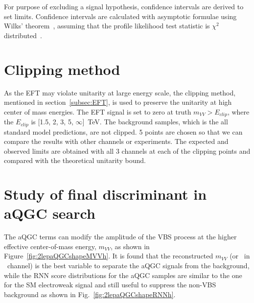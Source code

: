 For purpose of excluding a signal hypothesis, confidence intervals are derived to set limits. 
Confidence intervals are calculated with asymptotic formulae using Wilks' theorem~\cite{10.1214/aoms/1177732360}, assuming that the profile likelihood test statistic is $\chi^2$ distributed~\cite{Cowan:2010js}.

\section{Clipping method}
\label{subsec:clipping}
As the EFT may violate unitarity at large energy scale, the clipping method, mentioned in section~\ref{subsec:EFT}, is used to preserve the unitarity at high center of mass energies. 
The EFT signal is set to zero at truth $m_{VV} > E_{clip}$, where the $E_{clip}$ is [1.5, 2, 3, 5, $\infty$]~TeV. 
The background samples, which is the all standard model predictions, are not clipped.
5 points are chosen so that we can compare the results with other channels or experiments.
The expected and observed limits are obtained with all 3 channels at each of the clipping points and compared with the theoretical unitarity bound.

\section{Study of final discriminant in aQGC search}
\label{subsec:2binapproach}
The aQGC terms can modify the amplitude of the VBS process at the higher effective center-of-mass energy, 
$m_{VV}$, as shown in Figure~\ref{fig:2lepaQGCshapeMVVh}.
It is found that the reconstructed $m_{VV}$ (or \mt\ in \zlep\ channel) is the best variable to separate the aQGC signals from the background,
while the RNN score distributions for the aQGC samples are similar to the one for the SM electroweak signal and still useful to suppress the non-VBS background as shown in Fig.~\ref{fig:2lepaQGCshapeRNNh}.

